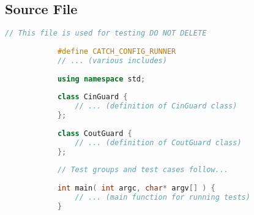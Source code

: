 \documentclass{article}
\begin{document}
	\subsection*{Source File}
	\begin{mdframed}[backgroundcolor=background, hidealllines=false, innerleftmargin=15pt, innerrightmargin=5pt, innertopmargin=0pt, innerbottommargin=-5pt]
		\begin{lstlisting}[language=C++]
			// This file is used for testing DO NOT DELETE
			
			#define CATCH_CONFIG_RUNNER
			// ... (various includes)
			
			using namespace std;
			
			class CinGuard {
				// ... (definition of CinGuard class)
			};
			
			class CoutGuard {
				// ... (definition of CoutGuard class)
			};
			
			// Test groups and test cases follow...
			
			int main( int argc, char* argv[] ) {
				// ... (main function for running tests)
			}
		\end{lstlisting}
	\end{mdframed}
	
\end{document}
